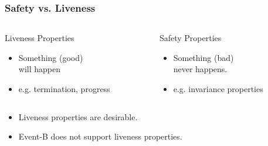 \begin{frame}
  \titlepage
\end{frame}
\logo{}

\begin{frame}
  \frametitle{Safety vs. Liveness}

  \begin{columns}
    \begin{column}{0.45\textwidth}
      \begin{block}{Liveness Properties}
        \begin{itemize}
        \item Something (good) \\
          \quad \alert{will happen}
          \medskip
        \item e.g. termination, progress
        \end{itemize}
      \end{block}
    \end{column}
    \begin{column}{0.45\textwidth}
      \begin{block}{Safety Properties}
        \begin{itemize}
        \item Something (bad) \\
          \quad \alert{never happens}.
          \medskip
        \item e.g. invariance properties
        \end{itemize}
      \end{block}
    \end{column}
  \end{columns}

  \vspace{2ex}

  \pause
  \begin{itemize}
  \item Liveness properties are \alert{desirable}.
    \pause
    
    \smallskip
    \begin{center}
    \end{center}
    \pause
    \medskip
  \item Event-B does not support liveness properties.
  \end{itemize}

\end{frame}

